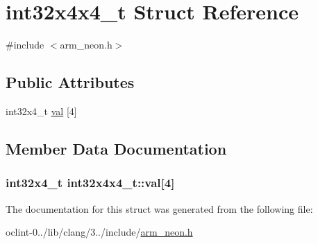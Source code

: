\hypertarget{structint32x4x4__t}{\section{int32x4x4\-\_\-t Struct Reference}
\label{structint32x4x4__t}
}


{\ttfamily \#include $<$arm\-\_\-neon.\-h$>$}

\subsection*{Public Attributes}
\begin{DoxyCompactItemize}
\item 
int32x4\-\_\-t \hyperlink{structint32x4x4__t_acdbbd8c936b670e94870a1c912b9d264}{val} \mbox{[}4\mbox{]}
\end{DoxyCompactItemize}


\subsection{Member Data Documentation}
\hypertarget{structint32x4x4__t_acdbbd8c936b670e94870a1c912b9d264}{
\subsubsection[{val}]{\setlength{\rightskip}{0pt plus 5cm}int32x4\-\_\-t int32x4x4\-\_\-t\-::val\mbox{[}4\mbox{]}}}\label{structint32x4x4__t_acdbbd8c936b670e94870a1c912b9d264}


The documentation for this struct was generated from the following file\-:\begin{DoxyCompactItemize}
\item 
oclint-\/0../lib/clang/3../include/\hyperlink{arm__neon_8h}{arm\-\_\-neon.\-h}\end{DoxyCompactItemize}
